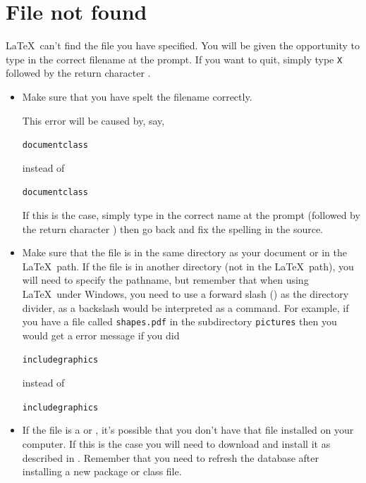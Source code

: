 
\section{File not found}

\LaTeX\ can't find the file you have specified.  You will be given
the opportunity to type in the correct filename at the prompt.  If
you want to quit, simply type \texttt{X} followed by the return
character \enter.

\begin{itemize}

\item Make sure that you have spelt the filename correctly.

This error will be caused by, say,
\begin{alltt}\wrong
\gls{documentclass}
\end{alltt}
instead of
\begin{alltt}\correct
\gls{documentclass}
\end{alltt}

If this is the case, simply type in the correct name at the prompt 
(followed by the return character \enter) then go back and fix the
spelling in the \gls{source}.

\item Make sure that the file is in the same directory as your
document or in the \LaTeX\ path.  If the file is in another directory
(not in the \LaTeX\ path), you will need to specify the pathname, but
remember that when using \LaTeX\ under Windows, you need to use a
forward slash () as the directory divider, as a backslash would be
interpreted as a command.  For example, if you have a file called
\texttt{shapes.pdf} in the subdirectory \texttt{pictures} then you
would get a  error message if you did
\begin{alltt}\wrong
\gls{includegraphics}
\end{alltt}
instead of
\begin{alltt}\correct
\gls{includegraphics}
\end{alltt}

\item If the file is a  or
, it's possible that you don't have that
file installed on your computer.  If this is the case you will need
to download and install it as described in
.  Remember that you need to
refresh the database after installing a new package or class file.

\end{itemize}

